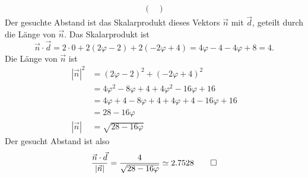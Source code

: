 \begin{loesung}
\begin{align*}
\begin{pmatrix}
\end{pmatrix}
\end{align*}
Der gesuchte Abstand ist das Skalarprodukt dieses Vektors $\vec n$
mit $\vec d$, geteilt durch die Länge von $\vec n$. Das Skalarprodukt
ist
\[
\vec n\cdot\vec d=2\cdot 0+2(2\varphi-2)+2(-2\varphi+4)
=4\varphi-4-4\varphi+8=4.
\]
Die Länge von $\vec n$ ist
\begin{align*}
|\vec n|^2&=(2\varphi-2)^2+(-2\varphi+4)^2\\
&=4 \varphi^2-8\varphi+4+4\varphi^2-16\varphi+16\\
&=4\varphi+4-8\varphi+4+4\varphi+4-16\varphi+16\\
&=28-16\varphi\\
|\vec n|&=\sqrt{28-16\varphi}
\end{align*}
Der gesucht Abstand ist also
\[
\frac{\vec n\cdot \vec d}{|\vec n|}=\frac{4}{\sqrt{28-16\varphi}}\simeq
2.7528
\qedhere
\]
\end{loesung}

